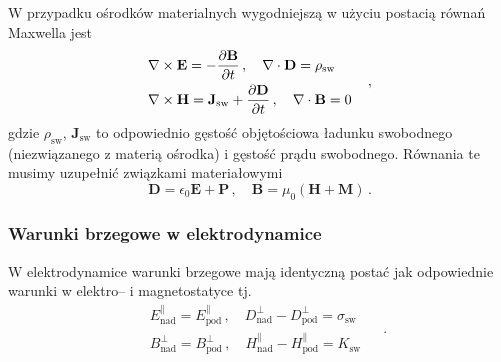 \documentclass[../main.tex]{subfiles}
\begin{document}
W przypadku ośrodków materialnych wygodniejszą w użyciu postacią równań Maxwella jest
\begin{equation*}
\begin{split}
        &\nabla\times\mathbf{E}=-\pdv{\mathbf{B}}{t}\,,\quad\nabla\cdot\mathbf{D}=\rho_\text{sw}\\
    &\nabla\times\mathbf{H}=\mathbf{J}_\text{sw}+\pdv{\mathbf{D}}{t}\,,\quad\nabla\cdot\mathbf{B}=0
\end{split}\quad\,,
\end{equation*}
gdzie \(\rho_\text{sw}\), \(\mathbf{J}_\text{sw}\) to odpowiednio gęstość objętościowa ładunku swobodnego (niezwiązanego z materią ośrodka) i gęstość prądu swobodnego. Równania te musimy uzupełnić związkami materiałowymi
\begin{equation*}
    \mathbf{D}=\epsilon_0\mathbf{E}+\mathbf{P}\,,\quad \mathbf{B}=\mu_0(\mathbf{H}+\mathbf{M})\,.
\end{equation*}
\subsubsection{Warunki brzegowe w elektrodynamice}
W elektrodynamice warunki brzegowe mają identyczną postać jak odpowiednie warunki w elektro-- i magnetostatyce tj.
\begin{equation*}
\begin{split}
        &E^\parallel_\text{nad}=E^\parallel_\text{pod}\,,\quad D^\perp_\text{nad}-D^\perp_\text{pod}=\sigma_\text{sw}\\
        &B^\perp_\text{nad}=B^\perp_\text{pod}\,,\quad H^\parallel_\text{nad}-H^\parallel_\text{pod}=K_\text{sw}
 \end{split}\quad\,.
\end{equation*}
\end{document}
